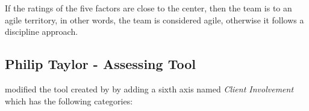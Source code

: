 




If the ratings of the five factors are close to the center, then the team is to an agile territory, in other words, the team is considered agile, otherwise it follows a discipline approach.

\subsection{Philip Taylor - Assessing Tool} 
\citet{taylor} modified the tool created by \citet{1231450} by adding a sixth axis named \textit{Client Involvement} which has the following categories:

